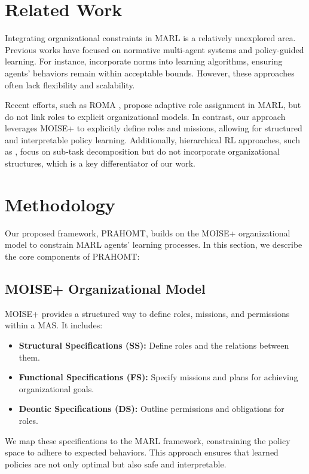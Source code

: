 \documentclass{article}
\begin{document}
\section{Related Work}
\label{sec:related-work}
Integrating organizational constraints in MARL is a relatively unexplored area. Previous works have focused on normative multi-agent systems and policy-guided learning. For instance, \cite{norms} incorporate norms into learning algorithms, ensuring agents' behaviors remain within acceptable bounds. However, these approaches often lack flexibility and scalability.

Recent efforts, such as ROMA \cite{roma}, propose adaptive role assignment in MARL, but do not link roles to explicit organizational models. In contrast, our approach leverages MOISE+ to explicitly define roles and missions, allowing for structured and interpretable policy learning. Additionally, hierarchical RL approaches, such as \cite{hierarchicalRL}, focus on sub-task decomposition but do not incorporate organizational structures, which is a key differentiator of our work.

\section{Methodology}
\label{sec:methodology}
Our proposed framework, PRAHOMT, builds on the MOISE+ organizational model to constrain MARL agents' learning processes. In this section, we describe the core components of PRAHOMT:

\subsection{MOISE+ Organizational Model}
MOISE+ provides a structured way to define roles, missions, and permissions within a MAS. It includes:
\begin{itemize}
    \item \textbf{Structural Specifications (SS):} Define roles and the relations between them.
    \item \textbf{Functional Specifications (FS):} Specify missions and plans for achieving organizational goals.
    \item \textbf{Deontic Specifications (DS):} Outline permissions and obligations for roles.
\end{itemize}
We map these specifications to the MARL framework, constraining the policy space to adhere to expected behaviors. This approach ensures that learned policies are not only optimal but also safe and interpretable.
\end{document}
